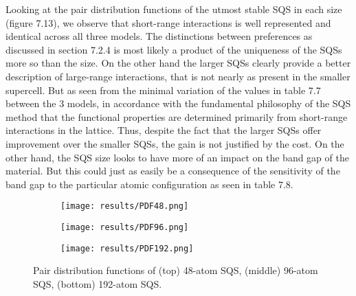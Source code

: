 Looking at the pair distribution functions of the utmost stable SQS in each size (figure 7.13), we observe that short-range interactions is well represented and identical across all three models. The distinctions between preferences as discussed in section 7.2.4 is most likely a product of the uniqueness of the SQSs more so than the size. On the other hand the larger SQSs clearly provide a better description of large-range interactions, that is not nearly as present in the smaller supercell. But as seen from the minimal variation of the values in table 7.7 between the 3 models, in accordance with the fundamental philosophy of the SQS method that the functional properties are determined primarily from short-range interactions in the lattice. Thus, despite the fact that the larger SQSs offer improvement over the smaller SQSs, the gain is not justified by the cost. On the other hand, the SQS size looks to have more of an impact on the band gap of the material. But this could just as easily be a consequence of the sensitivity of the band gap to the particular atomic configuration as seen in table 7.8.

\begin{figure}[H]
\begin{subfigure}{\textwidth}
\texttt{[image: results/PDF48.png]}
\end{subfigure}
\begin{subfigure}{\textwidth}
\texttt{[image: results/PDF96.png]}
\end{subfigure}
\begin{subfigure}{\textwidth}
\texttt{[image: results/PDF192.png]}
\end{subfigure}
\caption{Pair distribution functions of  (top) 48-atom SQS, (middle) 96-atom SQS, (bottom) 192-atom SQS.}
\end{figure}
